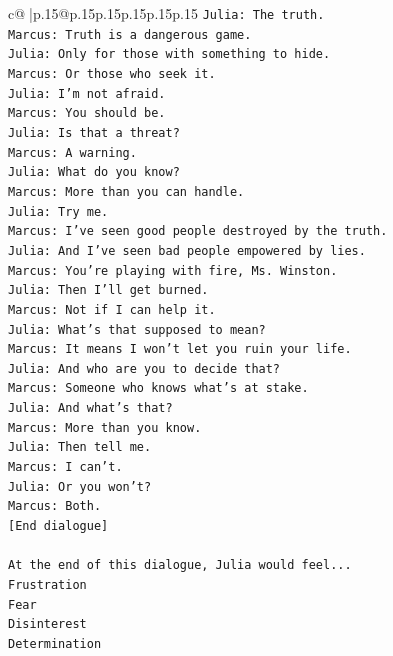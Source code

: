 \documentclass{article}
\begin{document}
{\begin{supertabular}{c@{$\;$}|p{.15\linewidth}@{}p{.15\linewidth}p{.15\linewidth}p{.15\linewidth}p{.15\linewidth}p{.15\linewidth}}
{{{\texttt{Julia: The truth.} \\
\texttt{Marcus: Truth is a dangerous game.} \\
\texttt{Julia: Only for those with something to hide.} \\
\texttt{Marcus: Or those who seek it.} \\
\texttt{Julia: I'm not afraid.} \\
\texttt{Marcus: You should be.} \\
\texttt{Julia: Is that a threat?} \\
\texttt{Marcus: A warning.} \\
\texttt{Julia: What do you know?} \\
\texttt{Marcus: More than you can handle.} \\
\texttt{Julia: Try me.} \\
\texttt{Marcus: I've seen good people destroyed by the truth.} \\
\texttt{Julia: And I've seen bad people empowered by lies.} \\
\texttt{Marcus: You're playing with fire, Ms. Winston.} \\
\texttt{Julia: Then I'll get burned.} \\
\texttt{Marcus: Not if I can help it.} \\
\texttt{Julia: What's that supposed to mean?} \\
\texttt{Marcus: It means I won't let you ruin your life.} \\
\texttt{Julia: And who are you to decide that?} \\
\texttt{Marcus: Someone who knows what's at stake.} \\
\texttt{Julia: And what's that?} \\
\texttt{Marcus: More than you know.} \\
\texttt{Julia: Then tell me.} \\
\texttt{Marcus: I can't.} \\
\texttt{Julia: Or you won't?} \\
\texttt{Marcus: Both.} \\
\texttt{{[}End dialogue{]}} \\
\\ 
\texttt{At the end of this dialogue, Julia would feel...} \\
\texttt{Frustration} \\
\texttt{Fear} \\
\texttt{Disinterest} \\
\texttt{Determination} \\
}}}
\end{supertabular}}
\end{document}
